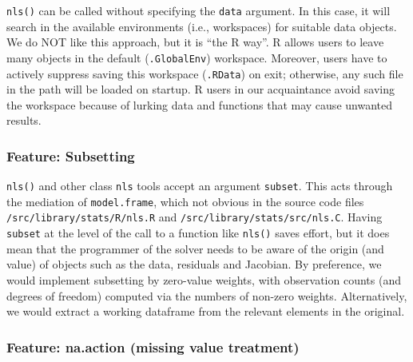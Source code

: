 \texttt{nls()} can be called without specifying the \texttt{data} argument. In this case, it will
search in the available environments (i.e., workspaces) for suitable data objects.
We do NOT like this approach, but it is ``the R way''. R allows users to leave many
objects in the default (\texttt{.GlobalEnv}) workspace. Moreover, users have to actively
suppress saving this workspace (\texttt{.RData}) on exit; otherwise, any such file in
the path will be loaded on startup. R users in our
acquaintance avoid saving the workspace because of lurking data and
functions that may cause unwanted results.

\hypertarget{feature-subsetting}{%
\subsubsection{Feature: Subsetting}\label{feature-subsetting}}

\texttt{nls()} and other class \texttt{nls} tools accept an argument \texttt{subset}. This acts through
the mediation of \texttt{model.frame}, which not obvious in the
source code files \texttt{/src/library/stats/R/nls.R} and \texttt{/src/library/stats/src/nls.C}.
Having \texttt{subset} at the level of the call to a function like
\texttt{nls()} saves effort, but it does mean that the programmer of the
solver needs to be aware of the
origin (and value) of objects such as the data, residuals and Jacobian.
By preference,
we would implement subsetting by zero-value weights, with observation counts
(and degrees of freedom) computed via the numbers of non-zero weights. Alternatively,
we would extract a working dataframe from the relevant elements in the original.

\hypertarget{feature-na.action-missing-value-treatment}{%
\subsubsection{Feature: na.action (missing value treatment)}\label{feature-na.action-missing-value-treatment}}

